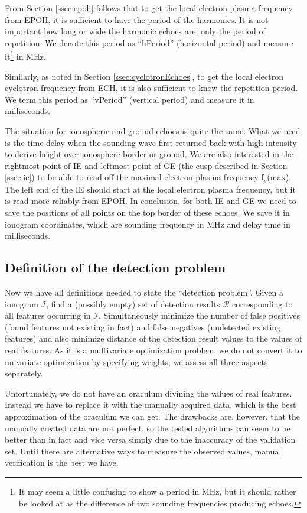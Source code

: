 From Section \ref{ssec:epoh} follows that to get the local electron plasma frequency from EPOH, it is sufficient to have the period of the harmonics. It is not important how long or wide the harmonic echoes are, only the period of repetition. We  denote this period as ``hPeriod'' (horizontal period) and measure it\footnote{It may seem a little confusing to show a period in MHz, but it should rather be looked at as the difference of two sounding frequencies producing echoes.} in MHz.

Similarly, as noted in Section \ref{ssec:cyclotronEchoes}, to get the local electron cyclotron frequency from ECH, it is also sufficient to know the repetition period. We term this period as ``vPeriod'' (vertical period) and measure it in milliseconds. 

The situation for ionospheric and ground echoes is quite the same. What we need is the time delay when the sounding wave first returned back with high intensity to derive height over ionosphere border or ground. We are also interested in the rightmost point of IE and leftmost point of GE (the cusp described in Section \ref{ssec:ie}) to be able to read off the maximal electron plasma frequency f$_p$(max). The left end of the IE should start at the local electron plasma frequency, but it is read more reliably from EPOH. In conclusion, for both IE and GE we need to save the positions of all points on the top border of these echoes. We save it in ionogram coordinates, which are sounding frequency in MHz and delay time in milliseconds.

\subsection{Definition of the detection problem}
Now we have all definitions needed to state the ``detection problem''. Given a ionogram $\mathcal{I}$, find a (possibly empty) set of detection results $\mathcal{R}$ corresponding to all features occurring in $\mathcal{I}$. Simultaneously minimize the number of false positives (found features not existing in fact) and false negatives (undetected existing features) and also minimize distance of the detection result values to the values of real features. As it is a multivariate optimization problem, we do not convert it to univariate optimization by specifying weights, we assess all three aspects separately.

Unfortunately, we do not have an oraculum divining the values of real features. Instead we have to replace it with the manually acquired data, which is the best approximation of the oraculum we can get. The drawbacks are, however, that the manually created data are not perfect, so the tested algorithms can seem to be better than in fact and vice versa simply due to the inaccuracy of the validation set. Until there are alternative ways to measure the observed values, manual verification is the best we have.

